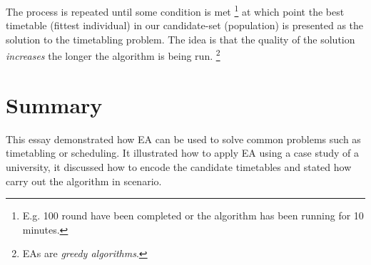 \documentclass[a4paper, 12pt, draft, titlepage]{article}
\begin{document}
The process is repeated until some condition is met \footnote{E.g. 100 round
have been completed or the algorithm has been running for 10 minutes.} at
which point the best timetable (fittest individual) in our candidate-set (population) is
presented as the solution to the timetabling problem.  The idea is that
the quality of the solution \emph{increases} the longer the algorithm
is being run. \footnote{EAs are \emph{greedy algorithms}.}
 
\section*{Summary}

This essay demonstrated how EA can be used to solve common problems
such as timetabling or scheduling. It illustrated how to apply EA using
a case study of a university, it discussed how to encode the candidate
timetables and stated how carry out the algorithm in scenario.

\printbibliography
\end{document}

